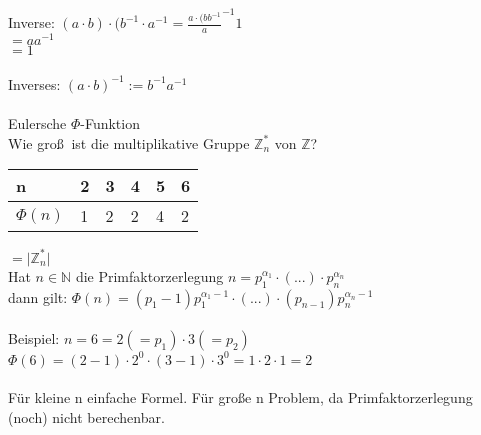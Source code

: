 \documentclass{scrartcl}
\begin{document}
Inverse: $(a \cdot b) \cdot (b^{-1} \cdot a^{-1}= \frac{a \cdot (bb^{-1}}a^{-1}{1}$\\
$= a a^{-1}$\\
$= 1$\\
\\
Inverses: $(a \cdot b)^{-1} := b^{-1}a^{-1}$\\
\\
\Large Eulersche $\Phi$-Funktion\\
\normalsize
Wie gro\ss $~$ ist die multiplikative Gruppe $\mathbb{Z}_n^*$ von $\mathbb{Z}$?\\
\begin{table}[H]
\begin{tabular}{l|l|l|l|l|l}
	n & 2 & 3 & 4 & 5 & 6 \\
	\hline
	$\Phi (n)$ & 1 & 2 & 2 & 4 & 2\\
\end{tabular}
\end{table}
$=\vert \mathbb{Z}_n^* \vert$
\\
Hat $n \in \mathbb{N}$ die Primfaktorzerlegung $n = p_1^{\alpha_1} \cdot (...) \cdot p_n^{\alpha_n} $\\
dann gilt: $\Phi (n) = (p_1-1)p_1^{\alpha_1-1} \cdot (...) \cdot (p_{n-1})p_n^{\alpha_n-1}$\\
\\
Beispiel:
$n = 6 = 2 (=p_1) \cdot 3(=p_2) $\\
$\Phi (6)=(2-1) \cdot 2^0 \cdot (3-1) \cdot 3^0 = 1 \cdot 2 \cdot 1 = 2$\\
\\
F\"ur kleine n einfache Formel. F\"ur gro\ss e n Problem, da Primfaktorzerlegung (noch) nicht berechenbar.\\
\end{document}
